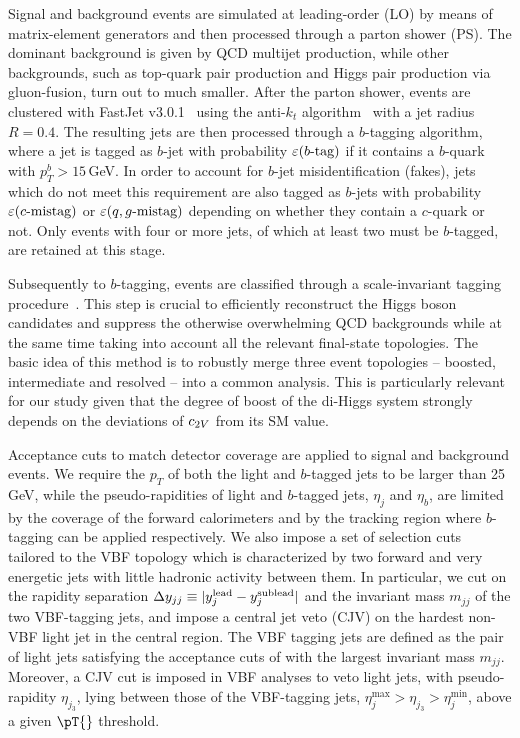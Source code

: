 Signal and background events are simulated at leading-order (LO) by means of
matrix-element  generators and then processed through a parton shower (PS).
%
The dominant background is given by QCD multijet production,
while other backgrounds, such as top-quark pair production and 
Higgs pair production via
gluon-fusion, turn out to much smaller.
%
After the parton shower, events are clustered with 
{\sc\small FastJet} v3.0.1~\cite{Cacciari:2011ma} using the
anti-$k_t$ algorithm~\cite{Cacciari:2008gp} with a jet radius $R=0.4$.
%
The resulting jets are then processed through a $b$-tagging algorithm,
where a jet is tagged as $b$-jet with probability $\varepsilon(b\text{-tag})$ 
if it contains a $b$-quark with $p_T^b > 15\,$GeV.
%
In order to account for $b$-jet misidentification (fakes),
jets which do not meet this requirement
are also tagged as $b$-jets with probability $\varepsilon(c\text{-mistag})$ or $\varepsilon(q,g\text{-mistag})$
depending on whether they contain a $c$-quark or not.
%
Only events with four or more jets, of which at least two
must be $b$-tagged, are retained at this stage.

Subsequently to $b$-tagging, events are
classified through a scale-invariant tagging procedure~\cite{Gouzevitch:2013qca,Behr:2015oqq}.
%
This step is crucial to efficiently reconstruct the Higgs boson candidates and
suppress the otherwise overwhelming QCD backgrounds while at the same time
taking into account all the relevant final-state topologies.
%
The basic idea of this method is to robustly merge three event
topologies -- { boosted, intermediate} and { resolved} --
into a common analysis.
%
This is
particularly relevant for our study given that
the degree of boost of the di-Higgs
system strongly depends
on the deviations of $c_{2V}$ from its SM value.

Acceptance cuts to match detector coverage are applied to signal and background events.
%
We require the $p_T$ of both the light and $b$-tagged jets
to be larger than 25 GeV, while 
the pseudo-rapidities of light
and $b$-tagged jets, $\eta_j$
and $\eta_b$, are limited
by the coverage of the forward calorimeters and
by the tracking region where $b$-tagging can be applied
respectively.
%
We also impose a set of selection cuts tailored
to the VBF topology which is characterized by two forward and very energetic
jets with little hadronic activity between them. In particular, we cut on the
rapidity separation $\Delta y_{jj}\equiv|y_j^{\rm lead}-y_j^{\rm sublead}|$ and
the invariant mass $m_{jj}$ of the two VBF-tagging jets, and impose a central
jet veto (CJV) on  the hardest non-VBF light jet in the central region. The VBF
tagging jets are defined as the pair of light jets satisfying the acceptance
cuts of with the largest invariant mass $m_{jj}$.
%
Moreover, a CJV cut  is imposed  in VBF analyses to veto light
jets, with pseudo-rapidity $\eta_{j_3}$, lying between those of the VBF-tagging
jets, $\eta_j^{\max}>\eta_{j_3}>\eta_j^{\min}$, above a given $\pT{}$ threshold.

